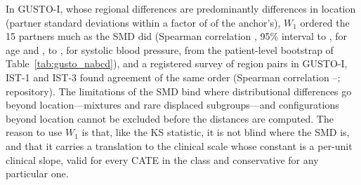 \documentclass[AMA,Times1COL]{WileyNJDv5}
\begin{document}
In GUSTO-I, whose regional differences are predominantly differences in location (partner standard deviations within a factor of  of the anchor's), $W_1$ ordered the 15 partners much as the SMD did (Spearman correlation , 95\% interval  to , for age and ,  to , %
for systolic blood pressure, from the patient-level bootstrap of Table~\ref{tab:gusto_nabcd}), and a registered survey of region pairs in GUSTO-I, IST-1 and IST-3 found agreement of the same order (Spearman correlation --; repository).\cite{ist1_2000,ist3_2012} The limitations of the SMD bind where distributional differences go beyond location---mixtures and rare displaced subgroups---and configurations beyond location cannot be excluded before the distances are computed. The reason to use $W_1$ is that, like the KS statistic, it is not blind where the SMD is, and that it carries a translation to the clinical scale whose constant is a per-unit clinical slope, valid for every CATE in the class and conservative for any particular one.

\end{document}
